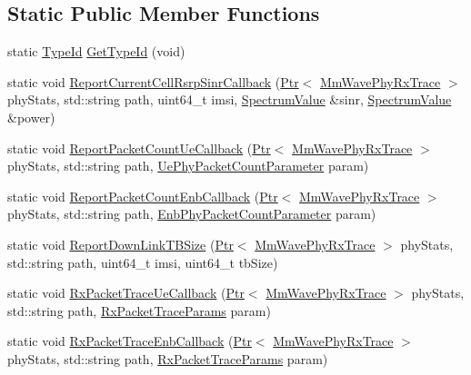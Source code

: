 \subsection*{Static Public Member Functions}
\begin{DoxyCompactItemize}
\item 
static \hyperlink{classns3_1_1TypeId}{Type\+Id} \hyperlink{classns3_1_1MmWavePhyRxTrace_a3fc38ab373c02cae2696704437061dc5}{Get\+Type\+Id} (void)
\item 
static void \hyperlink{classns3_1_1MmWavePhyRxTrace_a4d1ab7866b6920e1ba50b4929b05c383}{Report\+Current\+Cell\+Rsrp\+Sinr\+Callback} (\hyperlink{classns3_1_1Ptr}{Ptr}$<$ \hyperlink{classns3_1_1MmWavePhyRxTrace}{Mm\+Wave\+Phy\+Rx\+Trace} $>$ phy\+Stats, std\+::string path, uint64\+\_\+t imsi, \hyperlink{classns3_1_1SpectrumValue}{Spectrum\+Value} \&sinr, \hyperlink{classns3_1_1SpectrumValue}{Spectrum\+Value} \&power)
\item 
static void \hyperlink{classns3_1_1MmWavePhyRxTrace_ad89f14307f9e69fb3e81bbb5df3a74eb}{Report\+Packet\+Count\+Ue\+Callback} (\hyperlink{classns3_1_1Ptr}{Ptr}$<$ \hyperlink{classns3_1_1MmWavePhyRxTrace}{Mm\+Wave\+Phy\+Rx\+Trace} $>$ phy\+Stats, std\+::string path, \hyperlink{structns3_1_1UePhyPacketCountParameter}{Ue\+Phy\+Packet\+Count\+Parameter} param)
\item 
static void \hyperlink{classns3_1_1MmWavePhyRxTrace_a902af0c473aac0313ebba2b79384885c}{Report\+Packet\+Count\+Enb\+Callback} (\hyperlink{classns3_1_1Ptr}{Ptr}$<$ \hyperlink{classns3_1_1MmWavePhyRxTrace}{Mm\+Wave\+Phy\+Rx\+Trace} $>$ phy\+Stats, std\+::string path, \hyperlink{structns3_1_1EnbPhyPacketCountParameter}{Enb\+Phy\+Packet\+Count\+Parameter} param)
\item 
static void \hyperlink{classns3_1_1MmWavePhyRxTrace_a393e48a497839d7c3b30ad2fa340f63a}{Report\+Down\+Link\+T\+B\+Size} (\hyperlink{classns3_1_1Ptr}{Ptr}$<$ \hyperlink{classns3_1_1MmWavePhyRxTrace}{Mm\+Wave\+Phy\+Rx\+Trace} $>$ phy\+Stats, std\+::string path, uint64\+\_\+t imsi, uint64\+\_\+t tb\+Size)
\item 
static void \hyperlink{classns3_1_1MmWavePhyRxTrace_a960e754a6462e2779359f7faff22f4af}{Rx\+Packet\+Trace\+Ue\+Callback} (\hyperlink{classns3_1_1Ptr}{Ptr}$<$ \hyperlink{classns3_1_1MmWavePhyRxTrace}{Mm\+Wave\+Phy\+Rx\+Trace} $>$ phy\+Stats, std\+::string path, \hyperlink{structns3_1_1RxPacketTraceParams}{Rx\+Packet\+Trace\+Params} param)
\item 
static void \hyperlink{classns3_1_1MmWavePhyRxTrace_af32cd330352f02284369090060abf1fc}{Rx\+Packet\+Trace\+Enb\+Callback} (\hyperlink{classns3_1_1Ptr}{Ptr}$<$ \hyperlink{classns3_1_1MmWavePhyRxTrace}{Mm\+Wave\+Phy\+Rx\+Trace} $>$ phy\+Stats, std\+::string path, \hyperlink{structns3_1_1RxPacketTraceParams}{Rx\+Packet\+Trace\+Params} param)
\end{DoxyCompactItemize}

